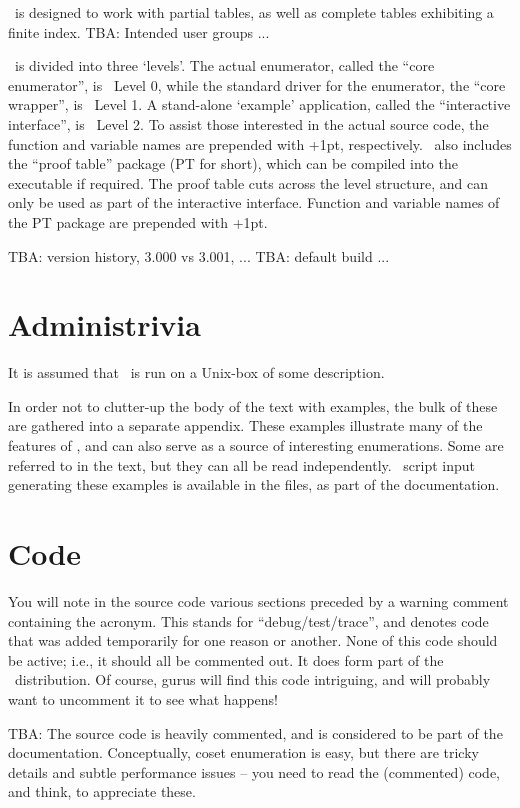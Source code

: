 
%
%

\ace\ is designed to work with partial tables, as well as complete tables
  exhibiting a finite index.
TBA:
Intended user groups ...

\ace\ is divided into three `levels'\kern-1.5pt.
The actual enumerator, called the ``core enumerator''\kern-2pt, is \ace\ 
  Level 0, while the standard driver for the enumerator, the ``core 
  wrapper''\kern-2pt, is \ace\ Level 1.
A stand-alone `example' application, called the ``interactive 
  interface''\kern-2pt, is \ace\ Level 2.
To assist those interested in the actual source code, the function and 
  variable names are prepended with \ttt{AL0\_}\kern+1pt, \ttt{AL1\_} \amp
  \ttt{AL2\_} respectively.
%
\ace\ also includes the ``proof table'' package (PT for short), which can
  be compiled into the executable if required.
The proof table cuts across the level structure, and can only be used as
  part of the interactive interface.
Function and variable names of the PT package are prepended with 
  \ttt{PT\_}\kern+1pt.

TBA: version history, 3.000 vs 3.001, ...
TBA: default build ...

\section{Administrivia}

It is assumed that \ace\ is run on a Unix-box of some description.

In order not to clutter-up the body of the text with examples, the bulk of
  these are gathered into a separate appendix.
These examples illustrate many of the features of \ace, and can also serve
  as a source of interesting enumerations.
Some are referred to in the text, but they can all be read independently.
\ace\ script input generating these examples is available in the 
  \ttt{ex---.in} files, as part of the documentation.

\section{Code}

You will note in the source code various sections preceded by a warning
  comment containing the \ttt{DTT} acronym.
This stands for ``debug/test/trace''\kern-2pt, and denotes code that was
  added temporarily for one reason or another.
None of this code should be active; i.e., it should all be commented out.
It does \tit{not} form part of the \ace\ distribution.
Of course, gurus will find this code intriguing, and will probably want
  to uncomment it to see what happens!

TBA:
The source code is heavily commented, and is considered to be part of the
  documentation.
Conceptually, coset enumeration is easy, but there are tricky details and
  subtle performance issues -- you need to read the (commented) code, and
  think, to appreciate these.
